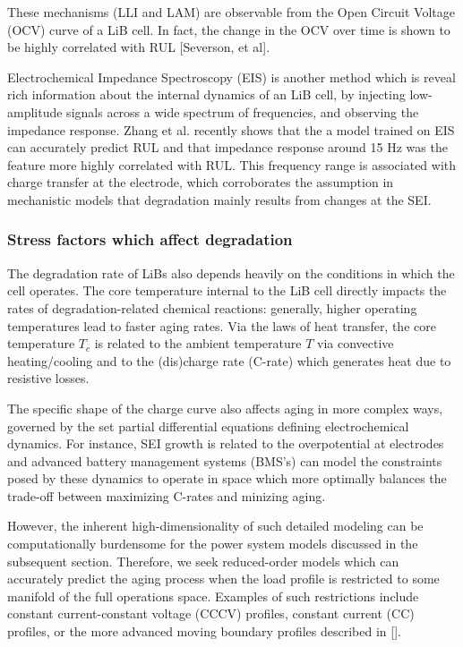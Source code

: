 \documentclass[conference]{IEEEtran}
\begin{document}
These mechanisms (LLI and LAM) are observable from the Open Circuit Voltage
(OCV) curve of a LiB cell. In fact, the change in the OCV over time
is shown to be highly correlated with RUL [Severson, et al].

Electrochemical Impedance Spectroscopy (EIS) is another method which
is reveal rich information about the internal dynamics of 
an LiB cell, by injecting low-amplitude signals across a wide spectrum
of frequencies, and observing the impedance response. Zhang et al.
recently shows that the a model trained on EIS can accurately predict
RUL and that impedance response around 15 Hz was the feature more highly
correlated with RUL. This frequency range is associated
with charge transfer at the electrode, which corroborates the
assumption in mechanistic models that degradation mainly results from
changes at the SEI.

\subsubsection{Stress factors which affect degradation}

The degradation rate of LiBs also depends heavily on the conditions
in which the cell operates. The core temperature internal to the LiB
cell directly impacts the rates of degradation-related chemical reactions:
generally, higher operating temperatures lead to faster aging rates.
Via the laws of heat transfer, the core temperature $T_c$ is related to
the ambient temperature $T$ via convective heating/cooling and to the
(dis)charge rate (C-rate) which generates heat due to resistive
losses.

The specific shape of the charge curve also affects aging in more
complex ways, governed by the set
partial differential equations defining electrochemical dynamics.
For instance, SEI growth is related to
the overpotential at electrodes and advanced battery management systems
(BMS's) can model the constraints posed by these dynamics to
operate in space which more optimally balances the trade-off between
maximizing C-rates and minizing aging.

However, the inherent high-dimensionality of such detailed modeling
can be computationally burdensome for the power system models discussed
in the subsequent section. Therefore, we seek reduced-order models
which can accurately predict the aging process when the load
profile is restricted to some manifold of the full operations
space. Examples of such restrictions include constant current-constant
voltage (CCCV) profiles, constant current (CC) profiles, or the
more advanced moving boundary profiles described in [].
\end{document}
